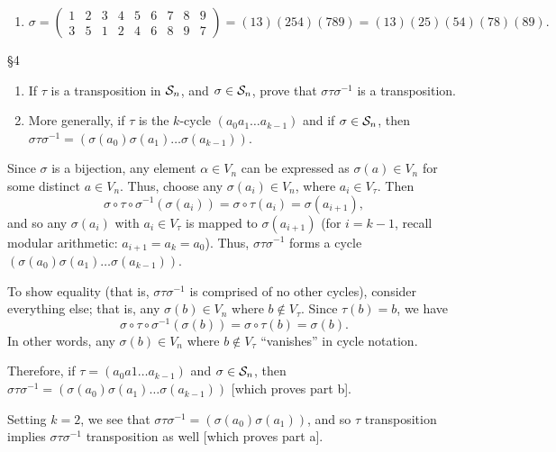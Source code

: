 \documentclass{homework}
\begin{document}
\begin{solution}
\begin{enumerate}[label=(\alph*)]
    \item \[
        \sigma= \begin{pmatrix} 1&2&3&4&5&6&7&8&9\\3&5&1&2&4&6&8&9&7
        \end{pmatrix}=(13)(254)(789)=(13)(25)(54)(78)(89)
    .\] 
  \end{enumerate}
\end{solution}

\begin{problem}{\S 4}
  \begin{enumerate}[label=(\alph*)]
    \item If $ \tau $ is a transposition in $ \mathcal{S}_n$, and $\sigma\in \mathcal{S}_n$, prove that
      $\sigma\tau\sigma^{-1}$ is a transposition.
    \item More generally, if $\tau$ is the $k$-cycle $(a_0a_1\ldots a_{k-1})$ and if $ \sigma\in
      \mathcal{S}_n$, then $ \sigma\tau\sigma^{-1}=(\sigma(a_0)\sigma(a_1)\ldots\sigma(a_{k-1}))$.
  \end{enumerate}
\end{problem}

\begin{solution}
  Since $\sigma$ is a bijection, any element $\alpha\in V_n$ can be expressed as $\sigma(a)\in V_n$
  for some distinct $a\in V_n$. Thus, choose any $\sigma(a_i)\in V_n$, where $a_i\in V_\tau$. Then
  \[
    \sigma\circ \tau\circ \sigma^{-1}(\sigma(a_i))=\sigma\circ \tau(a_i)=\sigma(a_{i+1})
  ,\] and so any $\sigma(a_i)$ with $a_i\in V_\tau$ is mapped to $\sigma(a_{i+1})$ (for $i=k-1$,
  recall modular arithmetic: $a_{i+1}=a_k=a_0$). Thus, $\sigma\tau\sigma^{-1}$ forms a cycle
  $(\sigma(a_0)\sigma(a_1)\ldots\sigma(a_{k-1}))$.

  To show equality (that is, $\sigma\tau\sigma^{-1}$ is comprised of no other cycles), consider
  everything else; that is, any $\sigma(b)\in V_n$ where $b\not\in V_\tau$. Since $\tau(b)=b$, we
  have \[
    \sigma\circ \tau\circ \sigma^{-1}(\sigma(b))=\sigma\circ \tau(b)=\sigma(b)
  .\] In other words, any $\sigma(b)\in V_n$ where $b\not\in V_\tau$ ``vanishes'' in cycle notation.

  Therefore, if $\tau=(a_0a1\ldots a_{k-1})$ and $\sigma\in \mathcal{S}_n$, then
  $\sigma\tau\sigma^{-1}=(\sigma(a_0)\sigma(a_1)\ldots\sigma(a_{k-1}))$ [which proves part b].

  Setting $k=2$, we see that $\sigma\tau\sigma^{-1}=(\sigma(a_0)\sigma(a_1))$, and so $\tau$ 
  transposition implies $\sigma\tau\sigma^{-1}$ transposition as well [which proves part a].
\end{solution}
\end{document}
